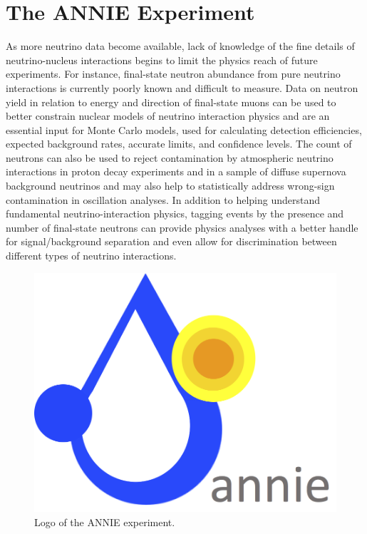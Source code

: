 
\chapter{The ANNIE Experiment}
\label{cha:annie}

 As more neutrino data become available, lack of knowledge of the fine details of %
 neutrino-nucleus interactions begins to limit the physics reach of future experiments. 
 For instance, final-state neutron abundance from pure neutrino interactions is currently %
 poorly known and difficult to measure.
 Data on neutron yield in relation to energy and direction of final-state muons can be used to %
 better constrain nuclear models of neutrino interaction %
 physics and are an essential input for Monte Carlo models, used for calculating %
 detection efficiencies, expected background rates, accurate limits, and confidence levels.
 The count of neutrons can also be used to reject contamination by atmospheric %
 neutrino interactions in proton decay experiments and in a sample of diffuse supernova %
 background neutrinos and may also help to statistically address wrong-sign contamination %
 in oscillation analyses.
 In addition to helping understand fundamental neutrino-interaction physics, tagging events %
 by the presence and number of final-state neutrons can provide physics analyses with a better %
 handle for signal/background separation and even allow for discrimination between %
 different types of neutrino interactions.

 \begin{figure}
   \centering
   \includegraphics[scale=.2]{pics/logo_2}
   \caption{Logo of the ANNIE experiment.}
   \label{fig:logo}
 \end{figure}

